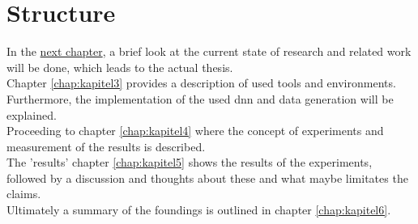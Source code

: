 	\section{Structure}
	\label{sec:structure}
		In the \hyperref[chap:kapitel2]{next chapter}, a brief look at the current state of research and related work will be done, which leads to the actual thesis.\\
		Chapter \ref{chap:kapitel3} provides a description of used tools and environments. Furthermore, the implementation of the used \ac{dnn} and data generation will be explained.\\
		Proceeding to chapter \ref{chap:kapitel4} where the concept of experiments and measurement of the results is described.\\
		The 'results' chapter \ref{chap:kapitel5} shows the results of the experiments, followed by a discussion and thoughts about these and what maybe limitates the claims.\\
		Ultimately a summary of the foundings is outlined in chapter \ref{chap:kapitel6}.
		





